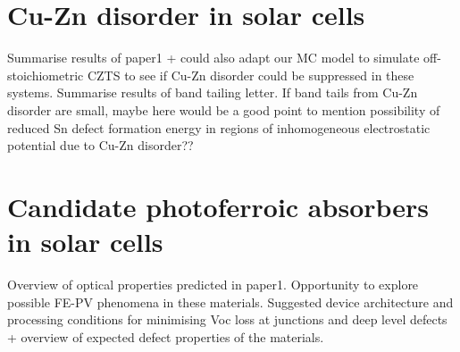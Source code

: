 \documentclass[11pt, twoside]{report}
\begin{document}
\section{Cu-Zn disorder in {\CZTS} solar cells}
Summarise results of paper1 + could also adapt our MC model to simulate off-stoichiometric CZTS to see if Cu-Zn disorder could be suppressed in these systems. Summarise results of band tailing letter. If band tails from Cu-Zn disorder are small, maybe here would be a good point to mention possibility of reduced Sn defect formation energy in regions of inhomogeneous electrostatic potential due to Cu-Zn disorder??

\section{Candidate photoferroic absorbers in solar cells}
Overview of optical properties predicted in paper1. Opportunity to explore possible FE-PV phenomena in these materials. Suggested device architecture and processing conditions for minimising Voc loss at junctions and deep level defects + overview of expected defect properties of the materials.

\appendix

\end{document}

